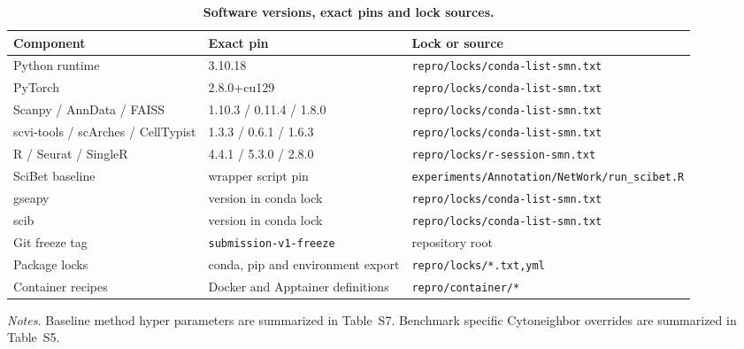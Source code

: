 \documentclass[11pt]{article}
\begin{document}
\begin{table}[htbp]
\centering
\caption{\textbf{Software versions, exact pins and lock sources.}}
\label{tab:s15_software_versions}
\scriptsize
\begin{tabularx}{\textwidth}{@{}L{0.25\textwidth} L{0.25\textwidth} Y@{}}
\toprule
\textbf{Component} & \textbf{Exact pin} & \textbf{Lock or source} \\
\midrule
Python runtime & 3.10.18 & \texttt{repro/locks/conda-list-smn.txt} \\
PyTorch & 2.8.0+cu129 & \texttt{repro/locks/conda-list-smn.txt} \\
Scanpy / AnnData / FAISS & 1.10.3 / 0.11.4 / 1.8.0 & \texttt{repro/locks/conda-list-smn.txt} \\
scvi-tools / scArches / CellTypist & 1.3.3 / 0.6.1 / 1.6.3 & \texttt{repro/locks/conda-list-smn.txt} \\
R / Seurat / SingleR & 4.4.1 / 5.3.0 / 2.8.0 & \texttt{repro/locks/r-session-smn.txt} \\
SciBet baseline & wrapper script pin & \texttt{experiments/Annotation/NetWork/run\_scibet.R} \\
gseapy & version in conda lock & \texttt{repro/locks/conda-list-smn.txt} \\
scib & version in conda lock & \texttt{repro/locks/conda-list-smn.txt} \\
Git freeze tag & \texttt{submission-v1-freeze} & repository root \\
Package locks & conda, pip and environment export & \texttt{repro/locks/*.txt,yml} \\
Container recipes & Docker and Apptainer definitions & \texttt{repro/container/*} \\
\bottomrule
\end{tabularx}

\vspace{0.5em}
{\raggedright\scriptsize\textit{Notes.} Baseline method hyper parameters are summarized in Table~S7. Benchmark specific Cytoneighbor overrides are summarized in Table~S5.\par}
\end{table}

\FloatBarrier
\end{document}
